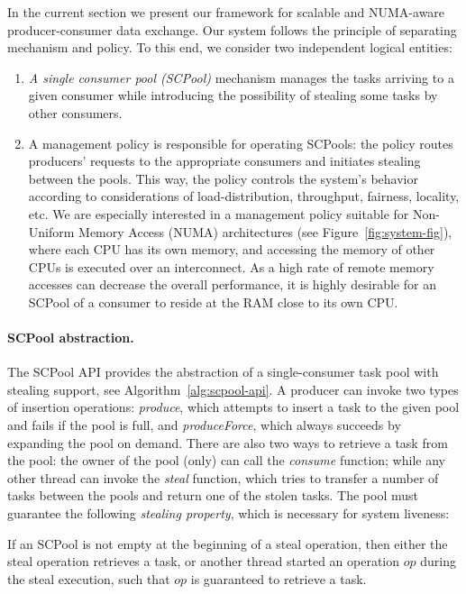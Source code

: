 In the current section we present our framework for scalable and NUMA-aware producer-consumer data exchange. 
Our system follows the principle of separating mechanism and policy.
To this end, we consider two independent logical entities: 
\begin{enumerate}
	\item \emph{A single consumer pool (SCPool)} mechanism manages the tasks arriving to a given consumer while introducing the possibility of stealing some tasks by other consumers.
	\item A management policy is responsible for operating SCPools: the policy routes producers' requests to the appropriate consumers and initiates stealing between the pools. This way, the policy controls the system's behavior according to considerations of load-distribution, throughput, fairness, locality, etc.
	We are especially interested in a management policy suitable for Non-Uniform Memory Access (NUMA) architectures (see Figure~\ref{fig:system-fig}), where each CPU has its own memory, and accessing the memory of other CPUs is executed over an interconnect. As a high rate of remote memory accesses can decrease the overall performance, it is highly desirable for an SCPool of a consumer to reside at the RAM close to its own CPU. 
\end{enumerate} 

\paragraph{SCPool abstraction.}

The SCPool API provides the abstraction of a single-consumer task pool with stealing support, see Algorithm~\ref{alg:scpool-api}.
A producer can invoke two types of insertion operations: \emph{produce}, which attempts to insert a task to the given pool and fails if the pool is full, and \emph{produceForce}, which always succeeds by expanding the pool on demand.
There are also two ways to retrieve a task from the pool: the owner of the pool (only) can call the \emph{consume} function; while any other thread can invoke the \emph{steal} function, which tries to transfer a number of tasks between the pools and return one of the stolen tasks. 
The pool must guarantee the following \emph{stealing property}, which is necessary for system liveness:
\begin{property}
\label{steal-progress-property}
If an SCPool is not empty at the beginning of a steal operation, then either the steal operation retrieves a task, or another thread started an operation $op$ during the steal execution, such that $op$ is guaranteed to retrieve a task.
\end{property}

